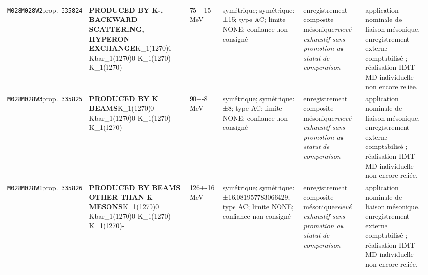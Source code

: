 \begin{landscape}
\begin{longtable}{L{1.85cm}L{4.45cm}L{2.35cm}L{4.05cm}L{3.35cm}L{7.15cm}}
\texttt{M028}\newline \texttt{M028W2}\newline prop.\ \texttt{335824} & \textbf{PRODUCED BY K-, BACKWARD SCATTERING, HYPERON EXCHANGE}\newline K\_\allowbreak{}1(1270)0 \textbar{}\allowbreak{} Kbar\_\allowbreak{}1(1270)0 \textbar{}\allowbreak{} K\_\allowbreak{}1(1270)+ \textbar{}\allowbreak{} K\_\allowbreak{}1(1270)- & 75+-15\,MeV & symétrique; symétrique: ±15; type AC; limite NONE; confiance non consigné & enregistrement composite mésonique\newline \emph{relevé exhaustif sans promotion au statut de comparaison} & application nominale de liaison mésonique. enregistrement externe comptabilisé ; réalisation HMT--MD individuelle non encore reliée. \\
\texttt{M028}\newline \texttt{M028W3}\newline prop.\ \texttt{335825} & \textbf{PRODUCED BY K BEAMS}\newline K\_\allowbreak{}1(1270)0 \textbar{}\allowbreak{} Kbar\_\allowbreak{}1(1270)0 \textbar{}\allowbreak{} K\_\allowbreak{}1(1270)+ \textbar{}\allowbreak{} K\_\allowbreak{}1(1270)- & 90+-8\,MeV & symétrique; symétrique: ±8; type AC; limite NONE; confiance non consigné & enregistrement composite mésonique\newline \emph{relevé exhaustif sans promotion au statut de comparaison} & application nominale de liaison mésonique. enregistrement externe comptabilisé ; réalisation HMT--MD individuelle non encore reliée. \\
\texttt{M028}\newline \texttt{M028W1}\newline prop.\ \texttt{335826} & \textbf{PRODUCED BY BEAMS OTHER THAN K MESONS}\newline K\_\allowbreak{}1(1270)0 \textbar{}\allowbreak{} Kbar\_\allowbreak{}1(1270)0 \textbar{}\allowbreak{} K\_\allowbreak{}1(1270)+ \textbar{}\allowbreak{} K\_\allowbreak{}1(1270)- & 126+-16\,MeV & symétrique; symétrique: ±16.081957783066429; type AC; limite NONE; confiance non consigné & enregistrement composite mésonique\newline \emph{relevé exhaustif sans promotion au statut de comparaison} & application nominale de liaison mésonique. enregistrement externe comptabilisé ; réalisation HMT--MD individuelle non encore reliée. \\

\end{longtable}
\end{landscape}
